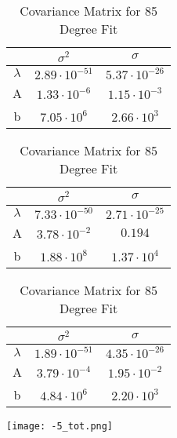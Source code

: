 \documentclass[10pt,letterpaper,onecolumn]{article}
\begin{document}
\begin{table}[h]
{
{%
\begin {center}
\begin {tabular} {c | c | c }
\hline\hline
 & $\sigma^{2}$ & $\sigma$ \\
\hline
$\lambda$ &	$2.89\cdot 10^{-51}$ & $5.37\cdot 10^{-26}$\\
\hline
A	& $1.33\cdot 10^{-6}$ & $1.15\cdot 10^{-3}$ \\
\hline
b & $7.05\cdot 10^{6}$ & $2.66\cdot 10^{3}$ \\
\hline
\end {tabular}
\end {center}
}
}
\caption {\label{tab:error}
Covariance Matrix for 41 Degree Fit
 }



{
{%
\begin {center}
\begin {tabular} {c | c | c }
\hline\hline
 & $\sigma^{2}$ & $\sigma$ \\
\hline
$\lambda$ &	$7.33\cdot 10^{-50}$ & $2.71\cdot 10^{-25}$\\
\hline
A	& $3.78\cdot 10^{-2}$ & $0.194$ \\
\hline
b & $1.88\cdot 10^{8}$ & $1.37\cdot 10^{4}$ \\
\hline
\end {tabular}
\end {center}
}
}
\caption {\label{tab:error}
Covariance Matrix for 64 Degree Fit
 }



{
{%
\begin {center}
\begin {tabular} {c | c | c }
\hline\hline
 & $\sigma^{2}$ & $\sigma$ \\
\hline
$\lambda$ &	$1.89\cdot 10^{-51}$ & $4.35\cdot 10^{-26}$\\
\hline
A	& $3.79\cdot 10^{-4}$ & $1.95\cdot 10^{-2}$ \\
\hline
b & $4.84\cdot 10^{6}$ & $2.20\cdot 10^{3}$ \\
\hline
\end {tabular}
\end {center}
}
}
\caption {\label{tab:error}
Covariance Matrix for 85 Degree Fit
 }
\end{table}


\begin{center}
 \texttt{[image: -5\_tot.png]}
 \label{fig:-5}
 \end{center}
\end{document}
